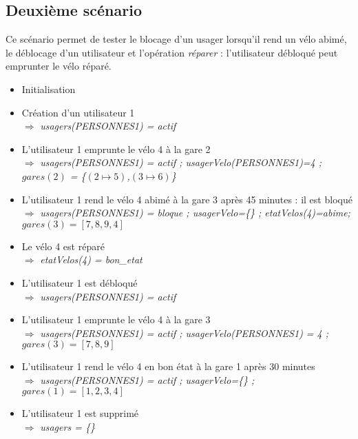 \documentclass[12pt]{article}
\begin{document}
\subsection{Deuxième scénario}
Ce scénario permet de tester le blocage d'un usager lorsqu'il rend un vélo abimé, le déblocage d'un utilisateur et l'opération \textit{réparer} : l'utilisateur débloqué peut emprunter le vélo réparé.
\begin{itemize}
  \item Initialisation
  \item Création d'un utilisateur 1 \\
  $\Rightarrow$ \textit{usagers(PERSONNES1) = actif}
  \item L'utilisateur 1 emprunte le vélo 4 à la gare 2 \\
  $\Rightarrow$ \textit{usagers(PERSONNES1) = actif ; usagerVelo(PERSONNES1)=4 ; $gares(2)$ = \{$(2\mapsto5)$,$(3\mapsto6)$\}}
  \item L'utilisateur 1 rend le vélo 4 abimé à la gare 3 après 45 minutes : il est bloqué \\
  $\Rightarrow$ \textit{usagers(PERSONNES1) = bloque ; usagerVelo=\{\} ; etatVelos(4)=abime; $gares(3) = [7,8,9,4]$}
  \item Le vélo 4 est réparé \\
  $\Rightarrow$ \textit{etatVelos(4) = bon\_etat}
  \item L'utilisateur 1 est débloqué \\
  $\Rightarrow$ \textit{usagers(PERSONNES1) = actif}
  \item L'utilisateur 1 emprunte le vélo 4 à la gare 3 \\
  $\Rightarrow$ \textit{usagers(PERSONNES1) = actif ; usagerVelo(PERSONNES1) = 4 ; $gares(3) = [7,8,9]$}
  \item L'utilisateur 1 rend le vélo 4 en bon état à la gare 1 après 30 minutes \\
  $\Rightarrow$ \textit{usagers(PERSONNES1) = actif ; usagerVelo=\{\} ; $gares(1) = [1,2,3,4]$}
  \item L'utilisateur 1 est supprimé \\
  $\Rightarrow$ \textit{usagers = \{\}}
\end{itemize}
\end{document}
